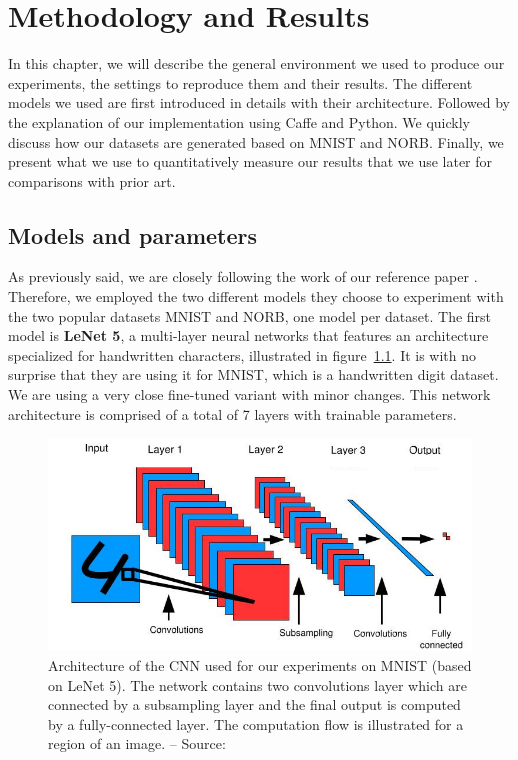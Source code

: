 \documentclass[a4paper,12pt]{report}
\begin{document}
\chapter{Methodology and Results}
\label{chap:results}

In this chapter, we will describe the general environment we used to produce our experiments, the settings to reproduce them and their results.
The different models we used are first introduced in details with their architecture.
Followed by the explanation of our implementation using Caffe and Python.
We quickly discuss how our datasets are generated based on MNIST and NORB.
Finally, we present what we use to quantitatively measure our results that we use later for comparisons with prior art.

\section{Models and parameters}

As previously said, we are closely following the work of our reference paper \cite{hadsell2006dimensionality}.
Therefore, we employed the two different models they choose to experiment with the two popular datasets MNIST and NORB, one model per dataset.
The first model is {\bf LeNet 5}, a multi-layer neural networks that features an architecture specialized for handwritten characters, illustrated in figure~\ref{fig:siamese_cnn}.
It is with no surprise that they are using it for MNIST, which is a handwritten digit dataset.
We are using a very close fine-tuned variant with minor changes.
This network architecture is comprised of a total of 7 layers with trainable parameters.

\begin{figure}[t]
    \begin{center}
        \includegraphics{thesis_figures/siamese_cnn.jpg}
    \end{center}
    \caption{Architecture of the CNN used for our experiments on MNIST (based on LeNet 5). The network contains two convolutions layer which are connected by a subsampling layer and the final output is computed by a fully-connected layer. The computation flow is illustrated for a region of an image. -- Source: \cite{hadsell2006dimensionality}}
    \label{fig:siamese_cnn}
\end{figure}
\end{document}
